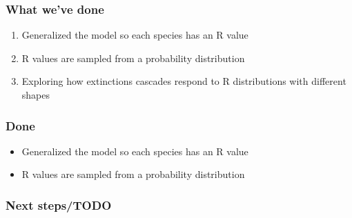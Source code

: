 \documentclass[12pt]{article}
\begin{document}
\subsubsection*{What we've done}

\begin{enumerate}
	\item{Generalized the model so each species has an R value}
	\item{R values are sampled from a probability distribution}
	\item{Exploring how extinctions cascades respond to R distributions with different shapes}	
\end{enumerate}







\subsubsection*{Done}

\begin{itemize}

	\item Generalized the model so each species has an R value 

	\item R values are sampled from a probability distribution

\end{itemize}

\subsubsection*{Next steps/TODO}
\end{document}
